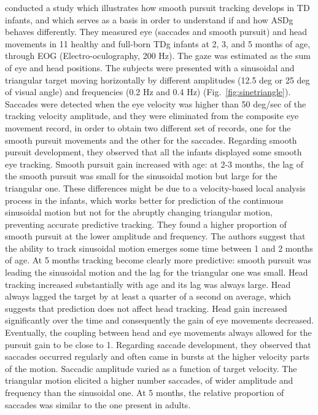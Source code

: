 \cite{vonhofsten1997smoothpursuit} conducted a study which illustrates how smooth pursuit tracking develops in TD infants, and which serves as a basis in order to understand if and how ASDg behaves differently.
They measured eye (saccades and smooth pursuit) and head movements in 11 healthy and full-born TDg infants at 2, 3, and 5 months of age, through EOG (Electro-oculography, 200 Hz). The gaze was estimated as the sum of eye and head positions. The subjects were presented with a sinusoidal and triangular target moving horizontally by different amplitudes (12.5 deg or 25 deg of visual angle) and frequencies (0.2 Hz and 0.4 Hz) (Fig.~\ref{fig:sinetriangle}). Saccades were detected when the eye velocity was higher than 50 deg/sec of the tracking velocity amplitude, and they were eliminated from the composite eye movement record, in order to obtain two different set of records, one for the smooth pursuit movements and the other for the saccades.
Regarding smooth pursuit development, they observed that all the infants displayed some smooth eye tracking. Smooth pursuit gain increased with age: at 2-3 months, the lag of the smooth pursuit was small for the sinusoidal motion but large for the triangular one. These differences might be due to a velocity-based local analysis process in the infants, which works better for prediction of the continuous sinusoidal motion but not for the abruptly changing triangular motion, preventing accurate predictive tracking. They found a higher proportion of smooth pursuit at the lower amplitude and frequency. The authors suggest that the ability to track sinusoidal motion emerges some time between 1 and 2 months of age.
At 5 months tracking become clearly more predictive: smooth pursuit was leading the sinusoidal motion and the lag for the triangular one was small. Head tracking increased substantially with age and its lag was always large.
Head always lagged the target by at least a quarter of a second on average, which suggests that prediction does not affect head tracking. Head gain increased significantly over the time and consequently the gain of eye movements decreased. Eventually, the coupling between head and eye movements always allowed for the pursuit gain to be close to 1.
Regarding saccade development, they observed that saccades occurred regularly and often came in bursts at the higher velocity parts of the motion. Saccadic amplitude varied as a function of target velocity. The triangular motion elicited a higher number saccades, of wider amplitude and frequency than the sinusoidal one. At 5 months, the relative proportion of saccades was similar to the one present in adults.

